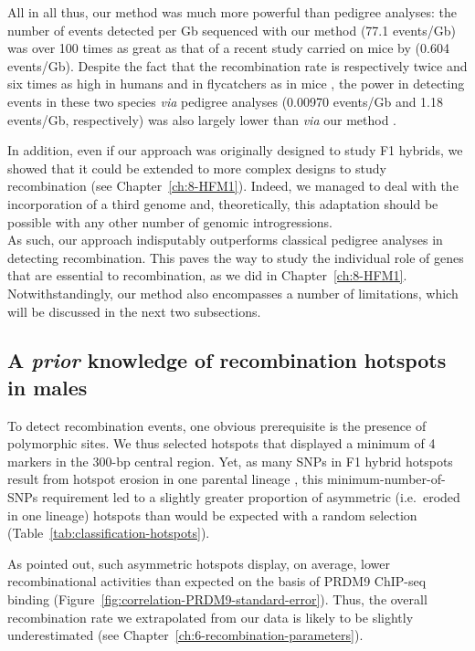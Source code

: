 All in all thus, our method was much more powerful than pedigree analyses: the number of events detected per Gb sequenced with our method (77.1 events/Gb) was over 100 times as great as that of a recent study carried on mice by \citet{li2018highresolution} (0.604 events/Gb).
Despite the fact that the recombination rate is respectively twice and six times as high in humans and in flycatchers as in mice \citep{kawakami2014highdensity,kawakami2017wholegenome}, the power in detecting events in these two species \textit{via} pedigree analyses (0.00970 events/Gb and 1.18 events/Gb, respectively) was also largely lower than \textit{via} our method \citep{halldorsson2016rate, smeds2016highresolution}.

In addition, even if our approach was originally designed to study F1 hybrids, we showed that it could be extended to more complex designs to study recombination (see Chapter~\ref{ch:8-HFM1}).
Indeed, we managed to deal with the incorporation of a third genome and, theoretically, this adaptation should be possible with any other number of genomic introgressions.\\

As such, our approach indisputably outperforms classical pedigree analyses in detecting recombination.
This paves the way to study the individual role of genes that are essential to recombination, as we did in Chapter~\ref{ch:8-HFM1}.
Notwithstandingly, our method also encompasses a number of limitations, which will be discussed in the next two subsections. 



\subsection{A \textit{prior} knowledge of recombination hotspots in males}

To detect recombination events, one obvious prerequisite is the presence of polymorphic sites.
We thus selected hotspots that displayed a minimum of 4 markers in the 300-bp central region.
Yet, as many SNPs in F1 hybrid hotspots result from hotspot erosion in one parental lineage \citep{smagulova2016evolutionary}, this minimum-number-of-SNPs requirement led to a slightly greater proportion of asymmetric (i.e.\ eroded in one lineage) hotspots than would be expected with a random selection (Table~\ref{tab:classification-hotspots}).

As \citet{li2018highresolution} pointed out, such asymmetric hotspots display, on average, lower recombinational activities than expected on the basis of PRDM9 ChIP-seq binding (Figure~\ref{fig:correlation-PRDM9-standard-error}).
Thus, the overall recombination rate we extrapolated from our data is likely to be slightly underestimated (see Chapter~\ref{ch:6-recombination-parameters}).

